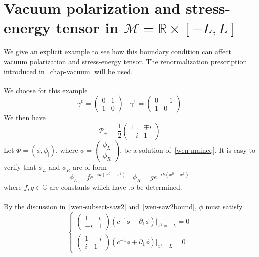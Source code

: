 \section{Vacuum polarization and stress-energy tensor in $\mathcal{M} = \mathbb R \times [-L, L]$ }\label{wen-sect-ex1d}
We give an explicit example to see how this boundary condition can affect vacuum polarization and stress-energy tensor. 
The renormalization prescription introduced in~\cref{chap-vacuum} will be used.\\\\
We choose for this example
\begin{equation*}
\gamma^0 = \begin{pmatrix} 0 & 1 \\ 1 & 0 \end{pmatrix} \quad
\gamma^1 = \begin{pmatrix} 0 & -1 \\ 1 & 0 \end{pmatrix}
\end{equation*}
We then have 
\begin{equation*}
 \mathcal{P}_\pm = \frac 1 2  \begin{pmatrix} 1 & \mp i \\ \pm i & 1 \end{pmatrix}
\end{equation*}
Let $\Phi = (\phi, \phi_|)$, where $\phi = \begin{pmatrix} \phi_L \\ \phi_R \end{pmatrix}$, be a solution of~\cref{wen-maineq}. 
It is easy to verify that $\phi_L$ and $\phi_R$ are of form
\begin{equation*}
\phi_L = f e^{-ik(x^0 - x^1)} \quad
\phi_R = g e^{-ik(x^0 + x^1)}
\end{equation*}
where $f, g\in\mathbb C$ are constants which have to be determined. \\\\
By the discussion in~\cref{wen-subsect-saw2} and~\cref{wen-saw2bound}, $\phi$ must satisfy
\begin{equation*}
\begin{cases}
\begin{pmatrix} 1 & i \\ -i & 1 \end{pmatrix}(c^{-1} \phi - \partial_1 \phi)\vert_{x^1 = -L} = 0 \\
%
\begin{pmatrix} 1 & -i \\ i & 1 \end{pmatrix}(c^{-1} \phi + \partial_1 \phi)\vert_{x^1 = L} = 0
\end{cases}
\end{equation*}
